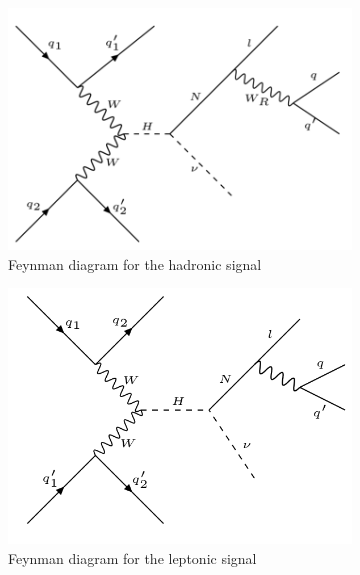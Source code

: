 \begin{figure}[h]
\centering
\begin{subfigure}{.5\textwidth}
  \centering
  \includegraphics[width=1\linewidth]{./Capitulos/Model/hadron_signal}
  \caption{Feynman diagram for the hadronic signal}
  \label{signal_hadron_feynman}
\end{subfigure}%
\begin{subfigure}{.5\textwidth}
  \centering
  \includegraphics[width=1\linewidth]{./Capitulos/Model/leptonic_signal}
  \caption{Feynman diagram for the leptonic signal}
  \label{signal_leptonic_feynman}
\end{subfigure}
\caption{}
\label{signals}
\end{figure}


